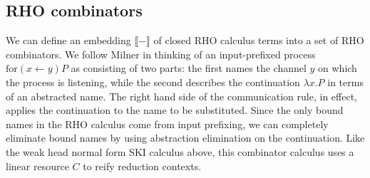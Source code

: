 \documentclass[a4paper,UKenglish]{lipics-v2016}
\newcommand{\for}{\mathrm{for }}
\newcommand{\interp}[1]{\llbracket #1 \rrbracket}
\newcommand{\from}{\leftarrow}
\begin{document}
\begin{center}
 \DP
\end{center}

\begin{center}
  
 \DP
\end{center}
\subsection{RHO combinators}
We can define an embedding $\interp{-}$ of closed RHO calculus terms into a set of RHO combinators.  We follow Milner \cite{milner91polyadicpi} in thinking of an input-prefixed process $\for(x \from y)P$ as consisting of two parts: the first names the channel $y$ on which the process is listening, while the second describes the continuation $\lambda x.P$ in terms of an abstracted name.  The right hand side of the communication rule, in effect, applies the continuation to the name to be substituted.  Since the only bound names in the RHO calculus come from input prefixing, we can completely eliminate bound names by using abstraction elimination on the continuation.  Like the weak head normal form SKI calculus above, this combinator calculus uses a linear resource $C$ to reify reduction contexts.
\end{document}
